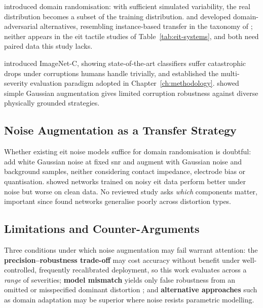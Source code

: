 \textcite{tobin2017} introduced domain randomisation: with sufficient simulated variability, the real distribution becomes a subset of the training distribution. \textcite{ganin2016} and \textcite{tzeng2017adda} developed domain-adversarial alternatives, resembling instance-based transfer in the taxonomy of \textcite{pan2010survey}; neither appears in the \gls{eit} tactile studies of Table~\ref{tab:eit-systems}, and both need paired data this study lacks.


\textcite{hendrycks2019} introduced ImageNet-C, showing state-of-the-art classifiers suffer catastrophic drops under corruptions humans handle trivially, and established the multi-severity evaluation paradigm adopted in Chapter~\ref{ch:methodology}. \textcite{rusak2020simple} showed simple Gaussian augmentation gives limited corruption robustness against diverse physically grounded strategies.

\subsection{Noise Augmentation as a Transfer Strategy}
\label{sec:lit-sim2real-noise}


Whether existing \gls{eit} noise models suffice for domain randomisation is doubtful: \textcite{chen2023} add white Gaussian noise at fixed \gls{snr} and \textcite{park2022skin} augment with Gaussian noise and background samples, neither considering contact impedance, electrode bias or quantisation. \textcite{ghasemazar2007} showed networks trained on noisy \gls{eit} data perform better under noise but worse on clean data. No reviewed study asks \emph{which} components matter, important since \textcite{geirhos2018} found networks generalise poorly across distortion types.


\subsection{Limitations and Counter-Arguments}
\label{sec:lit-sim2real-counterargs}


Three conditions under which noise augmentation may fail warrant attention: the \textbf{precision--robustness trade-off} \parencite{ghasemazar2007} may cost accuracy without benefit under well-controlled, frequently recalibrated deployment, so this work evaluates across a \emph{range} of severities; \textbf{model mismatch} yields only false robustness from an omitted or misspecified dominant distortion \parencite{geirhos2018}; and \textbf{alternative approaches} such as domain adaptation \parencite{ganin2016, tzeng2017adda} may be superior where noise resists parametric modelling.


